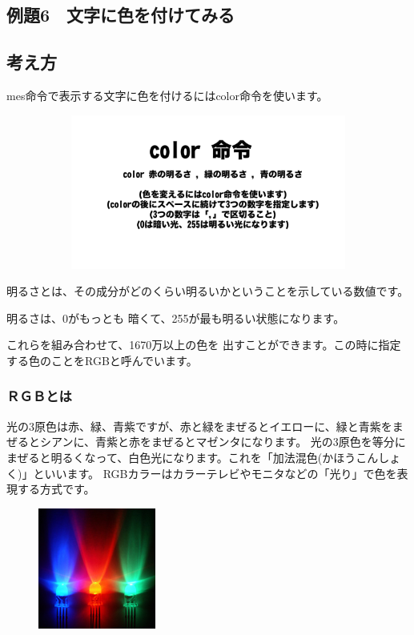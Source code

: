 \clearpage

\subsection{例題6　文字に色を付けてみる}

\subsection*{考え方}

mes命令で表示する文字に色を付けるにはcolor命令を使います。

\begin{figure}[H]
    \begin{center}
        \includegraphics[keepaspectratio,width=12.277cm,height=5.08cm]{text02-img/text02-img030.png}
    \end{center}
\end{figure}

明るさとは、その成分がどのくらい明るいかということを示している数値です。

明るさは、0がもっとも
暗くて、255が最も明るい状態になります。

これらを組み合わせて、1670万以上の色を
出すことができます。この時に指定する色のことをRGBと呼んでいます。

\subsubsection*{ＲＧＢとは}

光の3原色は赤、緑、青紫ですが、赤と緑をまぜるとイエローに、緑と青紫をまぜるとシアンに、青紫と赤をまぜるとマゼンタになります。
光の3原色を等分にまぜると明るくなって、白色光になります。これを「加法混色(かほうこんしょく)」といいます。
RGBカラーはカラーテレビやモニタなどの「光り」で色を表現する方式です。

\begin{figure}[H]
    \begin{center}
        \includegraphics[keepaspectratio,width=3.854cm,height=3.988cm]{text02-img/text02-img033.jpg}
    \end{center}
\end{figure}

